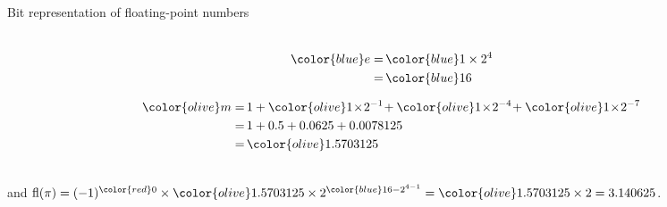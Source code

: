 \documentclass[t,usepdftitle=false]{beamer}
\begin{document}
\begin{frame}{Bit representation of floating-point numbers}
\begin{itemize}
\begin{itemize}
\begin{minipage}{0.2\textwidth}
\begin{align*}
\end{align*}
\end{minipage}
\hspace{-.6cm}\begin{minipage}{0.35\textwidth}
\begin{align*}
{\color{blue}e}
=&\, {\color{blue}1}\times 2^{4}\\
=&\,{\color{blue}16}
\end{align*}
\end{minipage}
\hspace{.2cm}\begin{minipage}{0.32\textwidth}
\begin{align*}
{\color{olive}m}=&\,1+
{\color{olive}1}\!\times\!2^{-1}\!+
{\color{olive}1}\!\times\!2^{-4}\!+
{\color{olive}1}\!\times\!2^{-7}\\
=&\,1+0.5+0.0625+0.0078125\\
=&\,{\color{olive}1.5703125}
\end{align*}
\end{minipage}\vspace{.2cm}\\
and $\text{fl}(\pi)=(-1)^{\color{red}0}\times {\color{olive}1.5703125}\times 2^{{\color{blue}16}-2^{4-1}}={\color{olive}1.5703125}\times 2
=3.140625$.
\end{itemize}
\end{itemize}
\end{frame}
\end{document}
